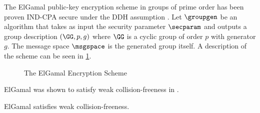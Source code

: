 The ElGamal public-key encryption scheme \cite{C:ElGamal84} in groups of prime order has been proven IND-CPA secure under the DDH assumption \cite{ElGamalSec,C:CraSho98,NaoRei04}.
Let $\groupgen$ be an algorithm that takes as input the security parameter $\secparam$ and outputs a group description $(\GG, p, g)$ where $\GG$ is a cyclic group of order $p$ with generator $g$.
The message space $\msgspace$ is the generated group itself.
A description of the scheme can be seen in \cref{fig:regelg}.

\begin{figure}[h]
	\begin{pcvstack}[boxed, center, space=1em]
		\begin{pchstack}[center]
			\procedure[linenumbering]{$\setup(\secparam)$}{
				\pcreturn \groupgen(\secparam)
			}
		\end{pchstack}

		\begin{pchstack}

		\end{pchstack}
	\end{pcvstack}
	\caption{The ElGamal Encryption Scheme}
	\label{fig:regelg}
\end{figure}

ElGamal was shown to satisfy weak collision-freeness in \cite{AC:Mohassel10}.
\begin{theorem}
	ElGamal satisfies weak collision-freeness.
\end{theorem}
